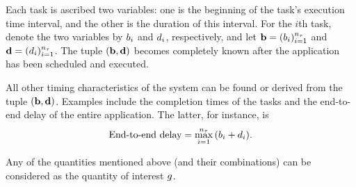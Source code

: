 Each task is ascribed two variables: one is the beginning of the task's
execution time interval, and the other is the duration of this interval. For the
$i$th task, denote the two variables by $b_i$ and $d_i$, respectively, and let
$\mathbf{b} = (b_i)_{i=1}^{{n_\tau}}$ and $\mathbf{d} = (d_i)_{i=1}^{{n_\tau}}$. The tuple $(\mathbf{b},
\mathbf{d})$ becomes completely known after the application has been scheduled and
executed.

All other timing characteristics of the system can be found or derived from the
tuple $(\mathbf{b}, \mathbf{d})$. Examples include the completion times of the tasks and the
end-to-end delay of the entire application. The latter, for instance, is
\[
  \text{End-to-end delay} = \max_{i = 1}^{n_\tau} \, (b_i + d_i).
\]

Any of the quantities mentioned above (and their combinations) can be considered
as the quantity of interest $g$.
